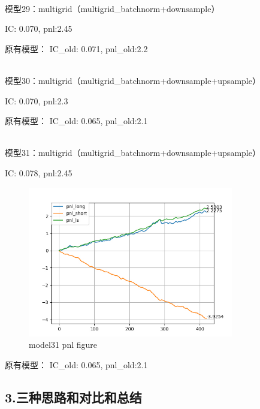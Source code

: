 \documentclass[11pt]{ctexart}
\begin{document}
~\\
模型29：multigrid（multigrid\_batchnorm+downsample）

{\kaishu \small IC: 0.070, pnl:2.45}

原有模型：
{\kaishu \small IC\_old: 0.071, pnl\_old:2.2}

~\\
模型30：multigrid（multigrid\_batchnorm+downsample+upsample）

{\kaishu \small IC: 0.070, pnl:2.3}

原有模型：
{\kaishu \small IC\_old: 0.065, pnl\_old:2.1}

~\\
模型31：multigrid（multigrid\_batchnorm+downsample+upsample）

{\kaishu \small IC: 0.078, pnl:2.45}

\begin{figure}[H]
\begin{center}
\includegraphics[width=0.8\textwidth]{plt3.PNG}
\end{center}
\caption{model31 pnl figure}
\label{FIG.2}
\end{figure}

原有模型：
{\kaishu \small IC\_old: 0.065, pnl\_old:2.1}

\subsection{3.三种思路和对比和总结}
\end{document}
